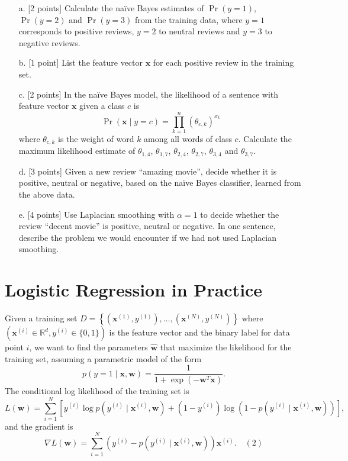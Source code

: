 \documentclass[a3paper,12pt]{extarticle} %
\begin{document}
\begin{enumerate}
    \item[a.] [2 points] Calculate the na\"ive Bayes estimates of $\Pr(y = 1)$, $\Pr(y = 2)$ and $\Pr(y = 3)$ from the training data, where $y = 1$ corresponds to positive reviews, $y = 2$ to neutral reviews and $y = 3$ to negative reviews.
    \item[b.] [1 point] List the feature vector $\mathbf{x}$ for each positive review in the training set.
    \item[c.] [2 points] In the na\"ive Bayes model, the likelihood of a sentence with feature vector $\mathbf{x}$ given a class $c$ is
    \[
    \Pr(\mathbf{x} \mid y = c) = \prod_{k=1}^{n} (\theta_{c,k})^{x_k}
    \]
    where $\theta_{c,k}$ is the weight of word $k$ among all words of class $c$. Calculate the maximum likelihood estimate of $\theta_{1,4}$, $\theta_{1,7}$, $\theta_{2,4}$, $\theta_{2,7}$, $\theta_{3,4}$ and $\theta_{3,7}$.
    \item[d.] [3 points] Given a new review ``amazing movie'', decide whether it is positive, neutral or negative, based on the na\"ive Bayes classifier, learned from the above data.
    \item[e.] [4 points] Use Laplacian smoothing with $\alpha = 1$ to decide whether the review ``decent movie'' is positive, neutral or negative. In one sentence, describe the problem we would encounter if we had not used Laplacian smoothing.
\end{enumerate}
\newpage
\section{Logistic Regression in Practice}
Given a training set \( D = \left\{ \left( \mathbf{x}^{(1)}, y^{(1)} \right), \dots, \left( \mathbf{x}^{(N)}, y^{(N)} \right) \right\} \) where \( \left( \mathbf{x}^{(i)} \in \mathbb{R}^d, y^{(i)} \in \{0, 1\} \right) \) is the feature vector and the binary label for data point \( i \), we want to find the parameters \( \hat{\mathbf{w}} \) that maximize the likelihood for the training set, assuming a parametric model of the form
\[
p(y = 1 \mid \mathbf{x}, \mathbf{w}) = \frac{1}{1 + \exp(-\mathbf{w}^T \mathbf{x})}.
\]
The conditional log likelihood of the training set is
\[
L(\mathbf{w}) = \sum_{i=1}^N \left[ y^{(i)} \log p\left( y^{(i)} \mid \mathbf{x}^{(i)}, \mathbf{w} \right) + \left( 1 - y^{(i)} \right) \log \left( 1 - p\left( y^{(i)} \mid \mathbf{x}^{(i)}, \mathbf{w} \right) \right) \right],
\]
and the gradient is
\[
\nabla L(\mathbf{w}) = \sum_{i=1}^N \left( y^{(i)} - p\left( y^{(i)} \mid \mathbf{x}^{(i)}, \mathbf{w} \right) \right) \mathbf{x}^{(i)}. \quad (2)
\]
\end{document}
